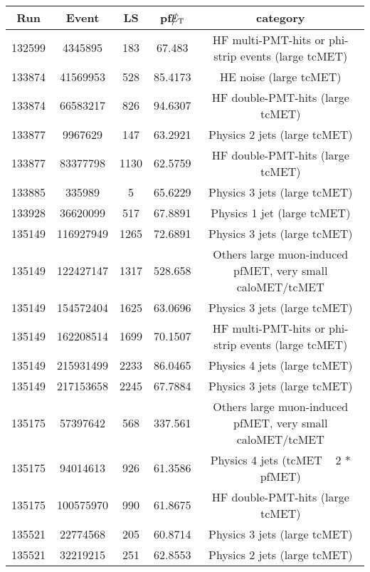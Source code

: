\begin{table}[htbp]
  \begin{center}
    \begin{tabular}{|c|c|c|c|c|}
      \hline
      Run & Event & LS & pf$\big\slash\hspace{-1.6ex}{E_\text{T}}$ & category \\     
      \hline
      132599 & 4345895     &  183  &    67.483   & HF multi-PMT-hits or phi-strip events (large tcMET) \\ 
      133874 & 41569953    &  528  &    85.4173  & HE noise (large tcMET) \\
      133874 & 66583217    &  826  &    94.6307  & HF double-PMT-hits  (large tcMET) \\
      133877 & 9967629     &  147  &    63.2921  & Physics 2 jets (large tcMET) \\
      133877 & 83377798    &  1130 &    62.5759  & HF double-PMT-hits  (large tcMET) \\
      133885 & 335989      &  5    &    65.6229  & Physics 3 jets (large tcMET) \\
      133928 & 36620099    &  517  &    67.8891  & Physics 1 jet (large tcMET) \\
      135149 & 116927949   &  1265 &    72.6891  & Physics 3 jets (large tcMET) \\
      135149 & 122427147   &  1317 &    528.658  & Others large muon-induced pfMET, very small caloMET/tcMET \\
      135149 & 154572404   &  1625 &    63.0696  & Physics 3 jets (large tcMET) \\
      135149 & 162208514   &  1699 &    70.1507  & HF multi-PMT-hits or phi-strip events (large tcMET) \\
      135149 & 215931499   &  2233 &    86.0465  & Physics 4 jets (large tcMET) \\
      135149 & 217153658   &  2245 &    67.7884  & Physics 3 jets (large tcMET) \\
      135175 & 57397642    &  568  &    337.561  & Others large muon-induced pfMET, very small caloMET/tcMET \\
      135175 & 94014613    &  926  &    61.3586  & Physics 4 jets (tcMET ~ 2 * pfMET) \\
      135175 & 100575970   &  990  &    61.8675  & HF double-PMT-hits (large tcMET) \\
      135521 & 22774568    &  205  &    60.8714  & Physics 3 jets (large tcMET) \\
      135521 & 32219215    &  251  &    62.8553  & Physics 2 jets (large tcMET) \\

\end{tabular}
\end{center}
\end{table}
